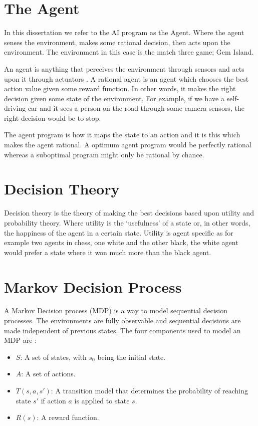 \documentclass{bhamthesis}
\theoremstyle{definition}
\begin{document}
\section{The Agent}
In this dissertation we refer to the AI program as the Agent. Where the agent senses the environment, makes some rational decision, then acts upon the environment. The environment in this case is the match three game; Gem Island.

An agent is anything that perceives the environment through sensors and acts upon it through actuators \cite{Russell2016}. A rational agent is an agent which chooses the best action value given some reward function. In other words, it makes the right decision given some state of the environment. For example, if we have a self-driving car and it sees a person on the road through some camera sensors, the right decision would be to stop.

The agent program is how it maps the state to an action and it is this which makes the agent rational. A optimum agent program would be perfectly rational whereas a suboptimal program might only be rational by chance.

\section{Decision Theory}
Decision theory is the theory of making the best decisions based upon utility and probability theory. Where utility is the `usefulness' of a state or, in other words, the happiness of the agent in a certain state. Utility is agent specific as for example two agents in chess, one white and the other black, the white agent would prefer a state where it won much more than the black agent. 



\section{Markov Decision Process}
A Markov Decision process (MDP) is a way to model sequential decision processes. The environments are fully observable and sequential decisions are made independent of previous states. The four components used to model an MDP are \cite{Russell2016}:

\begin{itemize}
	\item $S$: A set of states, with $s_0$ being the initial state.
	\item $A$: A set of actions.
	\item $T(s,a,s')$: A transition model that determines the probability of reaching state $s'$ if action $a$ is applied to state $s$.
	\item $R(s)$: A reward function.
\end{itemize}
\end{document}
